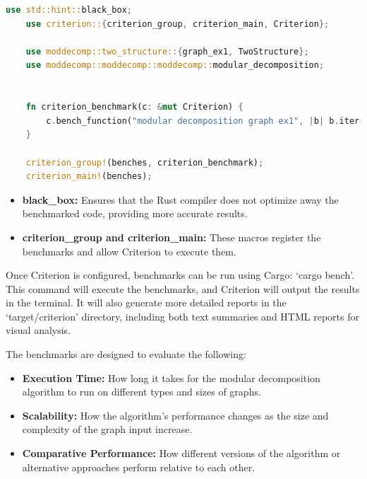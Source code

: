\begin{myex}

\end{myex}

\begin{lstlisting}[language=Rust, style=rust, caption={Example of benchmark code for modular decomposition}, label={lst:rust-example-of-benchmark-code}, firstnumber=1]
    use std::hint::black_box;
    use criterion::{criterion_group, criterion_main, Criterion};

    use moddecomp::two_structure::{graph_ex1, TwoStructure};
    use moddecomp::moddecomp::moddecomp::modular_decomposition;


    fn criterion_benchmark(c: &mut Criterion) {
        c.bench_function("modular decomposition graph ex1", |b| b.iter(|| modular_decomposition(black_box(&mut graph_ex1()), black_box(None))));
    }

    criterion_group!(benches, criterion_benchmark);
    criterion_main!(benches);
\end{lstlisting}

\begin{itemize}
    \item \textbf{black\_box:} Ensures that the Rust compiler does not optimize away the benchmarked code, providing more accurate results.
    \item \textbf{criterion\_group and criterion\_main:} These macros register the benchmarks and allow Criterion to execute them.
\end{itemize}

Once Criterion is configured, benchmarks can be run using Cargo: `cargo bench'.
This command will execute the benchmarks, and Criterion will output the results in the terminal.
It will also generate more detailed reports in the `target/criterion' directory, including both text summaries and HTML reports for visual analysis.

The benchmarks are designed to evaluate the following:
\begin{itemize}
    \item \textbf{Execution Time:} How long it takes for the modular decomposition algorithm to run on different types and sizes of graphs.
    \item \textbf{Scalability:} How the algorithm’s performance changes as the size and complexity of the graph input increase.
    \item \textbf{Comparative Performance:} How different versions of the algorithm or alternative approaches perform relative to each other.
\end{itemize}

